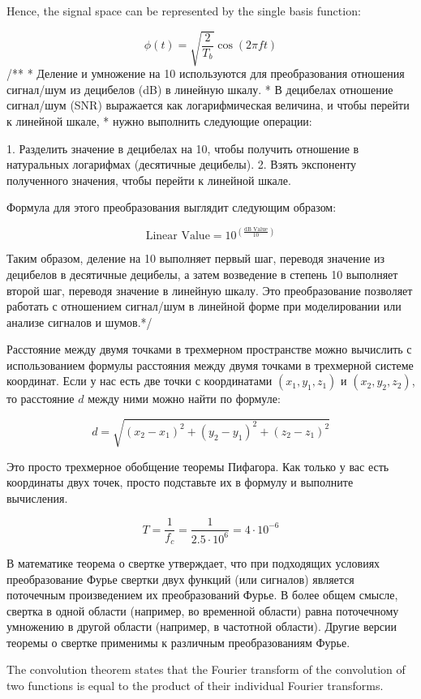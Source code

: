 \documentclass[14pt, report]{extarticle}
\begin{document}
Hence, the signal space can be represented by the single basis function:

\[
\phi(t) = \sqrt{\frac{2}{T_{b}}} \cos\left(2\pi ft\right)
\]
\newpage
/**
 * Деление и умножение на 10 используются для преобразования отношения сигнал/шум из децибелов (dB) в линейную шкалу.
 * В децибелах отношение сигнал/шум (SNR) выражается как логарифмическая величина, и чтобы перейти к линейной шкале,
 * нужно выполнить следующие операции:

1. Разделить значение в децибелах на 10, чтобы получить отношение в натуральных логарифмах (десятичные децибелы).
2. Взять экспоненту полученного значения, чтобы перейти к линейной шкале.

Формула для этого преобразования выглядит следующим образом:

\[ \text{Linear Value} = 10^{\left(\frac{\text{dB Value}}{10}\right)} \]

Таким образом, деление на 10 выполняет первый шаг, переводя значение из децибелов в десятичные децибелы,
 а затем возведение в степень 10 выполняет второй шаг, переводя значение в линейную шкалу.
 Это преобразование позволяет работать с отношением сигнал/шум в линейной форме при моделировании или анализе сигналов и шумов.*/

\newpage

Расстояние между двумя точками в трехмерном пространстве можно вычислить с использованием формулы расстояния между двумя точками в трехмерной системе координат. Если у нас есть две точки с координатами \((x_1, y_1, z_1)\) и \((x_2, y_2, z_2)\), то расстояние \(d\) между ними можно найти по формуле:

\[ d = \sqrt{(x_2 - x_1)^2 + (y_2 - y_1)^2 + (z_2 - z_1)^2} \]

Это просто трехмерное обобщение теоремы Пифагора. Как только у вас есть координаты двух точек, просто подставьте их в формулу и выполните вычисления.
  
$$T = \frac{1}{f_c} = \frac{1}{2.5 \cdot 10^6} = 4 \cdot 10^{-6} $$

В математике теорема о свертке утверждает, что при подходящих условиях преобразование Фурье свертки двух функций (или сигналов) является поточечным произведением их преобразований Фурье. 
В более общем смысле, свертка в одной области (например, во временной области) равна поточечному умножению в другой области (например, в частотной области). Другие версии теоремы о свертке применимы к различным преобразованиям Фурье.

The convolution theorem states that the Fourier transform of the convolution of two functions is equal to the product of their individual Fourier transforms.
\end{document}
